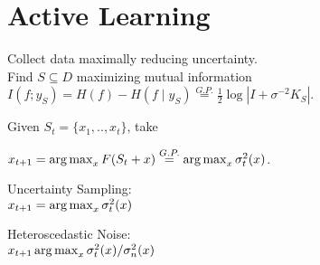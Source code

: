 \section{Active Learning}
Collect data maximally reducing uncertainty.\\
Find $S \subseteq D$ maximizing mutual information
{\fontsize{9}{6}\selectfont $I(f;y_S) =H(f) - H(f \mid y_S) \stackrel{G.P.}= \frac{1}{2} \log |I + \sigma^{-2} K_S|$}.

Given $S_t = \{x_1,.., x_t\}$, take

$x_{t+1} = \operatorname*{arg\,max}_{x } F(S_t +x) \stackrel{G.P.}= \operatorname*{arg\,max}_{x} \sigma_t^2(x)$.


Uncertainty Sampling:\\
\hspace*{3mm}$x_{t+1} = \operatorname*{arg\,max}_{x} \sigma_{t}^2(x)$

Heteroscedastic Noise:\\
\hspace*{3mm}$x_{t+1}\operatorname*{arg\,max}_{x} {\sigma_t^2(x)}/{\sigma_n^2(x)}$



